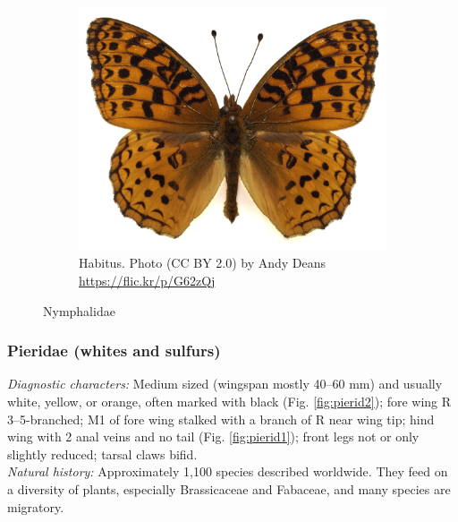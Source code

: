\documentclass[letterpaper, 11pt]{article}
\begin{document}
\begin{figure}[ht!]
\begin{subfigure}[ht!]{0.5\textwidth}
        \includegraphics[width=\textwidth]{NymphalidHabitus}
        \caption{Habitus. Photo (CC BY 2.0) by Andy Deans \url{https://flic.kr/p/G62zQj}}
        \label{fig:nymphalid2}
    \end{subfigure}
    \caption{Nymphalidae}\label{fig:nymphalids}
\end{figure}

\subsubsection{Pieridae (whites and sulfurs)}
\noindent{}\textit{Diagnostic characters:} Medium sized (wingspan mostly 40--60 mm) and usually white, yellow, or orange, often marked with black (Fig. \ref{fig:pierid2}); fore wing R 3--5-branched; M1 of fore wing stalked with a branch of R near wing tip; hind wing with 2 anal veins and no tail (Fig. \ref{fig:pierid1}); front legs not or only slightly reduced; tarsal claws bifid.\\

\noindent{}\textit{Natural history:} Approximately 1,100 species described worldwide. They feed on a diversity of plants, especially Brassicaceae and Fabaceae, and many species are migratory.
\end{document}
